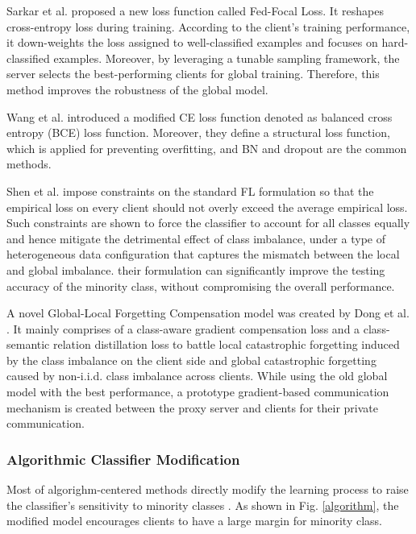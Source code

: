 \documentclass[10pt,journal,compsoc]{IEEEtran}
\begin{document}
	Sarkar et al. \cite{sarkar2020fed} proposed a new loss function called Fed-Focal Loss. It reshapes cross-entropy loss during training. According to the client's training performance, it down-weights the loss assigned to well-classified examples and focuses on hard-classified examples. Moreover, by leveraging a tunable sampling framework, the server selects the best-performing clients for global training. Therefore, this method improves the robustness of the global model. 
	
	Wang et al. \cite{wang2021federated} introduced a modified CE loss function denoted as balanced cross entropy (BCE) loss function. Moreover, they define a structural loss function, which is applied for preventing overfitting, and BN and dropout are the common methods. 
	
	
	Shen et al. \cite{shen2021agnostic} impose constraints on the standard FL formulation so that the empirical loss on every client should not overly exceed the average empirical loss. Such constraints are shown to force the classifier to account for all classes equally and hence mitigate the detrimental effect of class imbalance, under a type of heterogeneous data configuration that captures the mismatch between the local and global imbalance. their formulation can significantly improve the testing accuracy of the minority class, without compromising the overall performance.
	
	A novel Global-Local Forgetting Compensation model was created by Dong et al. \cite{dong2022federated}. It mainly comprises of a class-aware gradient compensation loss and a class-semantic relation distillation loss to battle local catastrophic forgetting induced by the class imbalance on the client side and global catastrophic forgetting caused by non-i.i.d. class imbalance across clients. While using the old global model with the best performance, a prototype gradient-based communication mechanism is created between the proxy server and clients for their private communication.
	
	\subsubsection{Algorithmic Classifier Modification}
	Most of algorighm-centered methods directly modify the learning process to raise the classifier's sensitivity to minority classes \cite{khan2017cost}. As shown in Fig. \ref{algorithm}, the modified model encourages clients to have a large margin for
	minority class.  
	
\end{document}
